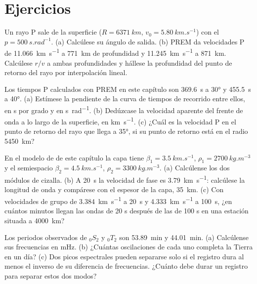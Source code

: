 \section{Ejercicios}

\begin{exercise}[$\star$]\label{exo:b3:seismology-imaging:1}
Un rayo P sale de la superficie ($R = \qty{6371}{km}$, $v_0 = \qty{5.80}{km.s^{-1}}$)
con el  $p = \qty{500}{s.rad^{-1}}$. (a) Calcúlese su ángulo de
salida. (b) PREM da velocidades P de \qty{11.066}{km.s^{-1}} a \qty{771}{km} de profundidad
y \qty{11.245}{km.s^{-1}} a \qty{871}{km}. Calcúlese $r/v$ a ambas profundidades y
hállese la profundidad del punto de retorno del rayo por interpolación lineal.
\end{exercise}

\begin{exercise}[$\star$]\label{exo:b3:seismology-imaging:2}
Los tiempos P calculados con PREM en este capítulo son \qty{369.6}{s} a \ang{30}
y \qty{455.5}{s} a \ang{40}. (a) Estímese la pendiente de la curva de tiempos de recorrido
entre ellos, en \unit{s} por grado y en \unit{s.rad^{-1}}. (b) Dedúzcase
la velocidad aparente del frente de onda a lo largo de la superficie, en
\unit{km.s^{-1}}. (c) ¿Cuál es la velocidad P en el punto de retorno del rayo
que llega a \ang{35}, si su punto de retorno está en el radio \qty{5450}{km}?
\end{exercise}

\begin{exercise}[$\star$]\label{exo:b3:seismology-imaging:3}
En el modelo de  de este capítulo la capa tiene $\beta_1 =
\qty{3.5}{km.s^{-1}}$, $\rho_1 = \qty{2700}{kg.m^{-3}}$ y el semiespacio
$\beta_2 = \qty{4.5}{km.s^{-1}}$, $\rho_2 = \qty{3300}{kg.m^{-3}}$.
(a) Calcúlense los dos módulos de cizalla. (b) A \qty{20}{s} la velocidad de fase es
\qty{3.79}{km.s^{-1}}: calcúlese la longitud de onda y compárese con el espesor de la capa,
\qty{35}{km}. (c) Con velocidades de grupo de \qty{3.384}{km.s^{-1}} a
\qty{20}{s} y \qty{4.333}{km.s^{-1}} a \qty{100}{s}, ¿en cuántos minutos llegan
las ondas de 20 s después de las de 100 s en una estación situada a \qty{4000}{km}?
\end{exercise}

\begin{exercise}[$\star$]\label{exo:b3:seismology-imaging:4}
Los periodos observados de ${}_0S_2$ y ${}_0T_2$ son \qty{53.89}{min} y
\qty{44.01}{min}. (a) Calcúlense sus frecuencias en \unit{mHz}. (b) ¿Cuántas
oscilaciones de cada uno completa la Tierra en un día? (c) Dos picos espectrales
pueden separarse solo si el registro dura al menos el inverso de su
diferencia de frecuencias. ¿Cuánto debe durar un registro para separar estos dos modos?
\end{exercise}

